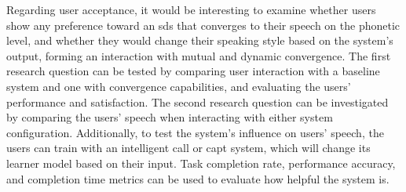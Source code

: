 Regarding user acceptance, it would be interesting to examine whether users show any preference toward an \ac{sds} that converges to their speech on the phonetic level, and whether they would change their speaking style based on the system's output, forming an interaction with mutual and dynamic convergence.
The first research question can be tested by comparing user interaction with a baseline system and one with convergence capabilities, and evaluating the users' performance and satisfaction.
The second research question can be investigated by comparing the users' speech when interacting with either system configuration.
Additionally, to test the system's influence on users' speech, the users can train with an intelligent \acf{call} or \acf{capt} system, which will change its learner model based on their input.
Task completion rate, performance accuracy, and completion time metrics can be used to evaluate how helpful the system is.






